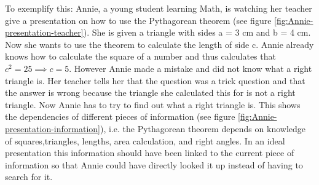 \documentclass[twoside, 12pt]{article}
\begin{document}
To exemplify this: Annie, a young student learning Math, is watching her teacher give a presentation on how to use the Pythagorean theorem (see figure \ref{fig:Annie-presentation-teacher}). She is given a triangle with sides a = 3 cm and b = 4 cm. Now she wants to use the theorem to calculate the length of side c. Annie already knows how to calculate the square of a number and thus calculates that $c^2 = 25 \implies c = 5$. However Annie made a mistake and did not know what a right triangle is. Her teacher tells her that the question was a trick question and that the answer is wrong because the triangle she calculated this for is not a right triangle. Now Annie has to try to find out what a right triangle is. This shows the dependencies of different pieces of information (see figure \ref{fig:Annie-presentation-information}), i.e. the Pythagorean theorem depends on knowledge of squares,triangles, lengths, area calculation, and right angles. In an ideal presentation this information should have been linked to the current piece of information so that Annie could have directly looked it up instead of having to search for it.\\
\end{document}
